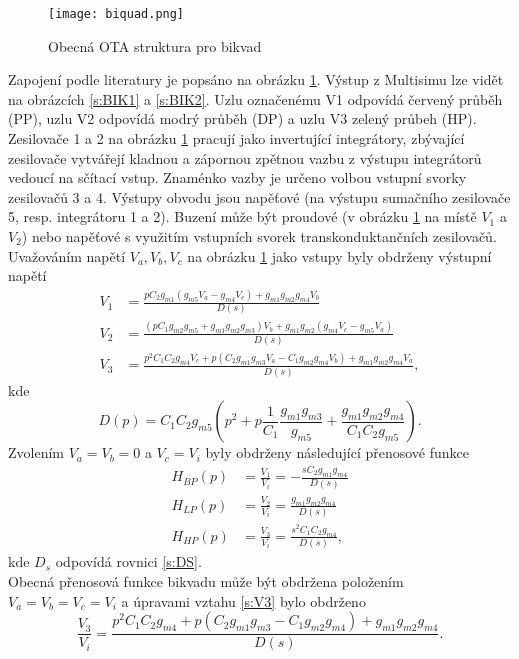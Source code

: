\begin{figure}[h]
\centering
\texttt{[image: biquad.png]}
\caption[Obecná OTA struktura pro bikvad]{Obecná OTA struktura pro bikvad \label{s:BIK}}
\end{figure}
\noindent Zapojení podle literatury \cite{18} je popsáno na obrázku \ref{s:BIK}. Výstup z Multisimu lze vidět na obrázcích \ref{s:BIK1} a \ref{s:BIK2}. Uzlu označenému V1 odpovídá červený průběh (PP), uzlu V2 odpovídá modrý průběh (DP) a uzlu V3 zelený průbeh (HP). Zesilovače 1 a 2 na obrázku \ref{s:BIK} pracují jako invertující integrátory, zbývající zesilovače vytvářejí kladnou a zápornou zpětnou vazbu z výstupu integrátorů vedoucí na sčítací vstup. Znaménko vazby je určeno volbou vstupní svorky zesilovačů 3 a 4. Výstupy obvodu jsou napěťové (na výstupu sumačního zesilovače 5, resp. integrátoru 1 a 2). Buzení může být proudové (v obrázku \ref{s:BIK} na místě $V_1$ a $V_2$) nebo napěťové s využitím vstupních svorek transkonduktančních zesilovačů. Uvažováním napětí $V_a, V_b, V_c$ na obrázku \ref{s:BIK} jako vstupy byly obdrženy výstupní napětí
\begin{align}
V_1 &= \frac{pC_2g_{m1}(g_{m5}V_a - g_{m4}V_c) + g_{m1}g_{m2}g_{m4}V_b}{D(s)}\\
V_2 &= \frac{(pC_1g_{m2}g_{m5} + g_{m1}g_{m2}g_{m3})V_b + g_{m1}g_{m2}(g_{m4}V_c - g_{m5}V_a)}{D(s)}\\
V_3 &= \frac{p^2C_1C_2g_{m4}V_c + p(C_2g_{m1}g_{m3}V_a - C_1g_{m2}g_{m4}V_b) + g_{m1}g_{m2}g_{m4}V_a}{D(s)},
\end{align}\label{s:V3}
kde
\begin{equation}
D(p) = C_1C_2g_{m5}(p^2 + p\frac{1}{C_1}\frac{g_{m1}g_{m3}}{g_{m5}} + \frac{g_{m1}g_{m2}g_{m4}}{C_1C_2g_{m5}}).
\end{equation}\label{s:DS}
\noindent Zvolením $V_a = V_b = 0$ a $V_c = V_i$ byly obdrženy následující přenosové funkce
\begin{align}
H_{BP}(p) &= \frac{V_1}{V_i} = - \frac{sC_2g_{m1}g_{m4}}{D(s)}\\
H_{LP}(p) &= \frac{V_2}{V_i} = \frac{g_{m1}g_{m2}g_{m4}}{D(s)}\\
H_{HP}(p) &= \frac{V_3}{V_i} = \frac{s^2C_1C_2g_{m4}}{D(s)},
\end{align}
kde $D_s$ odpovídá rovnici \ref{s:DS}.\\
Obecná přenosová funkce bikvadu může být obdržena položením $V_a = V_b = V_c = V_i$ a úpravami vztahu \ref{s:V3} bylo obdrženo
\begin{equation}
\frac{V_3}{V_i} = \frac{p^2C_1C_2g_{m4} + p(C_2g_{m1}g_{m3} - C_1g_{m2}g_{m4}) + g_{m1}g_{m2}g_{m4}}{D(s)}.
\end{equation}
